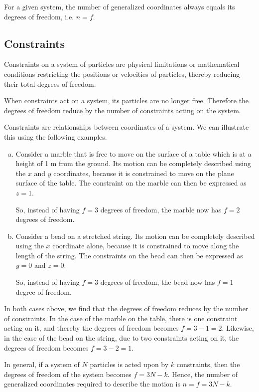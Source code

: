 For a given system, the number of generalized coordinates always equals its degrees of freedom, i.e. $n=f$.

\subsection{Constraints}
Constraints on a system of particles are physical limitations or mathematical conditions restricting the positions or velocities of particles, thereby reducing their total degrees of freedom.

When constraints act on a system, its particles are no longer free. Therefore the degrees of freedom reduce by the number of constraints acting on the system.

Constraints are relationships between coordinates of a system. We can illustrate this using the following examples.
\begin{enumerate}[a)]
	\item Consider a marble that is free to move on the surface of a table which is at a height of 1 m from the ground. Its motion can be completely described using the $x$ and $y$ coordinates, because it is constrained to move on the plane surface of the table. The constraint on the marble can then be expressed as $z=1$.
	
	So, instead of having $f=3$ degrees of freedom, the marble now has $f=2$ degrees of freedom.
	
	\item Consider a bead on a stretched string. Its motion can be completely described using the $x$ coordinate alone, because it is constrained to move along the length of the string. The constraints on the bead can then be expressed as $y=0$ and $z=0$.
	
	So, instead of having $f=3$ degrees of freedom, the bead now has $f=1$ degree of freedom.
\end{enumerate}

In both cases above, we find that the degrees of freedom reduces by the number of constraints. In the case of the marble on the table, there is one constraint acting on it, and thereby the degrees of freedom becomes $f=3-1=2$. Likewise, in the case of the bead on the string, due to two constraints acting on it, the degrees of freedom becomes $f=3-2=1$.

In general, if a system of $N$ particles is acted upon by $k$ constraints, then the degrees of freedom of the system becomes $f=3N-k$. Hence, the number of generalized coordinates required to describe the motion is $n=f=3N-k$.

